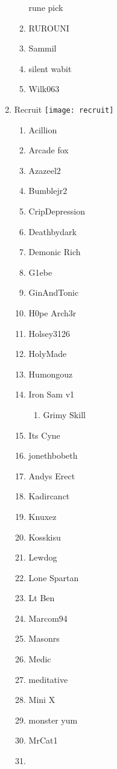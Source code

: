 \documentclass{article}
\begin{document}
\begin{enumerate}[I]
\begin{enumerate}[I]
	rune pick
      \item
	RUROUNI
      \item
	Sammil
      \item
	silent wabit
      \item
	Wilk063
    \end{enumerate}
  \item
    Recruit \texttt{[image: recruit]}
    \begin{enumerate}[I]
      \item 
	Acillion
      \item
	Arcade fox
      \item
	Azazeel2
      \item
	Bumblejr2
      \item
	CripDepression
      \item
	Deathbydark
      \item
	Demonic Rich
      \item
	G1ebe
      \item
	GinAndTonic
      \item
	H0pe Arch3r
      \item
	Holsey3126
      \item
	HolyMade
      \item
	Humongouz
      \item
	Iron Sam v1
	  \begin{enumerate}[I]
	    \item
	      Grimy Skill
	  \end{enumerate}
      \item
	Its Cyne
      \item
	jonethbobeth
      \item
	Andys Erect
      \item
	Kadircanct
      \item
	Knuxez
      \item
	Kosskisu
      \item
	Lewdog
      \item
	Lone Spartan
      \item
	Lt Ben
      \item
	Marcom94
      \item
	Masonrs
      \item
	Medic
      \item
	meditative
      \item
	Mini X
      \item
	monster yum
      \item
	MrCat1
      \item

\end{enumerate}
\end{enumerate}
\end{document}
